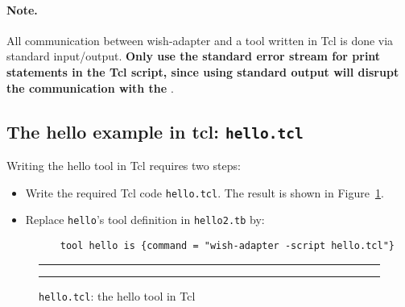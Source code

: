 \paragraph{Note.} All communication between wish-adapter and a
 tool written in Tcl is done via standard input/output. {\bf Only use
the standard error stream for print statements in the Tcl script,
since using standard output will disrupt the communication with the
\TB}.

\subsection{\label{Ex-hello.tcl}The hello example in tcl: {\tt hello.tcl}}

Writing the hello tool in Tcl requires two steps:
\begin{itemize}
\item Write the required Tcl code {\tt hello.tcl}. The result is shown in Figure~\ref{fig:hello.tcl}.
\item Replace {\tt hello}'s tool definition in {\tt hello2.tb} by:
\begin{verbatim}
      tool hello is {command = "wish-adapter -script hello.tcl"}
\end{verbatim}
\end{itemize}


\begin{figure}
\rule{\textwidth}{0.5mm}

  \caption{{\tt hello.tcl}: the hello tool in Tcl}
  \label{fig:hello.tcl}
\rule{\textwidth}{0.5mm}
\end{figure}
